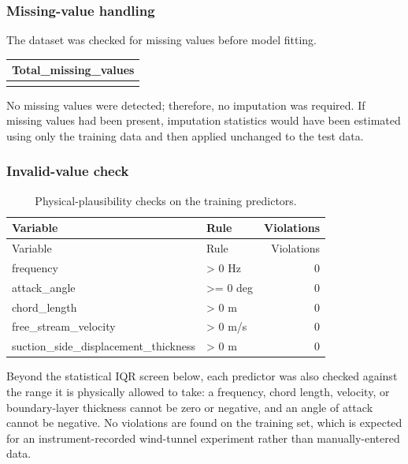 \documentclass[
  11pt,
]{article}
\newcounter{none} %
\begin{document}
\subsubsection{Missing-value handling}\label{missing-value-handling}

The dataset was checked for missing values before model fitting.

{\def\LTcaptype{none} %
\begin{longtable}[]{@{}r@{}}
\toprule\noalign{}
Total\_missing\_values \\
\midrule\noalign{}
\endhead
\bottomrule\noalign{}
\endlastfoot
0 \\
\end{longtable}
}

No missing values were detected; therefore, no imputation was required.
If missing values had been present, imputation statistics would have
been estimated using only the training data and then applied unchanged
to the test data.

\subsubsection{Invalid-value check}\label{invalid-value-check}

\begin{longtable}[]{@{}llr@{}}
\caption{Physical-plausibility checks on the training
predictors.}\tabularnewline
\toprule\noalign{}
Variable & Rule & Violations \\
\midrule\noalign{}
\endfirsthead
\toprule\noalign{}
Variable & Rule & Violations \\
\midrule\noalign{}
\endhead
\bottomrule\noalign{}
\endlastfoot
frequency & \textgreater{} 0 Hz & 0 \\
attack\_angle & \textgreater= 0 deg & 0 \\
chord\_length & \textgreater{} 0 m & 0 \\
free\_stream\_velocity & \textgreater{} 0 m/s & 0 \\
suction\_side\_displacement\_thickness & \textgreater{} 0 m & 0 \\
\end{longtable}

Beyond the statistical IQR screen below, each predictor was also checked
against the range it is physically allowed to take: a frequency, chord
length, velocity, or boundary-layer thickness cannot be zero or
negative, and an angle of attack cannot be negative. No violations are
found on the training set, which is expected for an instrument-recorded
wind-tunnel experiment rather than manually-entered data.
\end{document}
